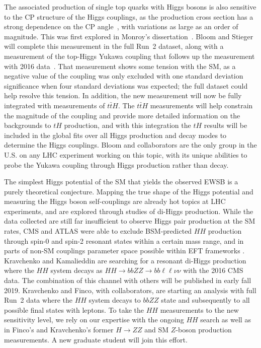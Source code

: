 The associated production of single top quarks with Higgs bosons is also sensitive to the CP structure of the Higgs couplings, as the production cross section has a strong dependence on the CP angle~\cite{bib:tH_theory}, with variations as large as an order of magnitude.  This was first explored in Monroy's dissertation~\cite{bib:monroy_thesis}. Bloom and Stieger will complete this measurement in the full Run~2 dataset, along with a measurement of the top-Higgs Yukawa coupling that follows up the measurement with 2016 data~\cite{bib:tHqRun2}.  That measurement shows some tension with the SM, as a negative value of the coupling was only excluded with one standard deviation significance when four standard deviations was expected; the full dataset could help resolve this tension.  In addition, the new measurement will now be fully integrated with measurements of $t\bar{t}H$.  The $t\bar{t}H$ measurements will help constrain the magnitude of the coupling and provide more detailed information on the backgrounds to $tH$ production, and with this integration the $tH$ results will be included in the global fits over all Higgs production and decay modes to determine the Higgs couplings.  Bloom and collaborators are the only group in the U.S. on any LHC experiment working on this topic, with its unique abilities to probe the Yukawa coupling through Higgs production rather than decay.

The simplest Higgs potential of the SM that yields the observed EWSB is a purely theoretical conjecture. Mapping the true shape of the Higgs potential and measuring the Higgs boson self-couplings are already hot topics at LHC experiments, and are explored through studies of di-Higgs production. While the data collected are still far insufficient to observe Higgs pair production at the SM rates, CMS and ATLAS were able to exclude BSM-predicted $HH$ production through spin-0 and spin-2 resonant states \cite{bib:radion-graviton-CMS,bib:radion-graviton-ATLAS} within a certain mass range, and in parts of non-SM couplings parameter space possible within EFT frameworks \cite{bib:HH-benchmarks}. Kravchenko and Kamalieddin are searching for a resonant di-Higgs production where
the $HH$ system decays as $HH\to bbZZ\to bb\ell\ell\nu\nu$ with the 2016 CMS data.
The combination of this channel with others will be published in early fall 2019. Kravchenko and Finco, with collaborators, are starting an analysis with full Run~2 data where the $HH$ system decays to $bbZZ$ state and subsequently to all possible final states with leptons. To take the $HH$ measurements to the new sensitivity level, we rely on our expertise with the ongoing $HH$ search as well as in Finco's and Kravchenko's former $H\to ZZ$ and SM $Z$-boson production measurements. A new graduate student will join this effort.

